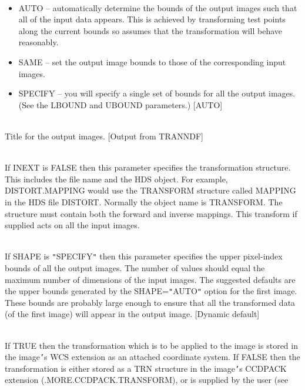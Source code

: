 \documentclass[twoside,11pt]{article}
\renewcommand{\_}{\texttt{\symbol{95}}}
\newcommand{\qt}[1]{{\tt "}#1{\tt "}}
\newcommand{\sstsubsection}[1]{ \item[{#1}] \mbox{} \\}
\newcommand{\sstitemlist}[1]{
  \mbox{} \\
  \vspace{-3.5ex}
  \begin{itemize}
     #1
  \end{itemize}
}
\newcommand{\sstitem}{\item}
\newcommand{\sstsubsection}[1]{\item[{#1}]}
\newcommand{\sstitemlist}[1]{
      \begin{itemize}
         #1
      \end{itemize}
      \\
   }
\newcommand{\sstitem}{\item}
\begin{document}
{{{         \sstitemlist{

            \sstitem
               AUTO    -- automatically determine the bounds of the
                            output images such that all of the input data
                            appears. This is achieved by transforming test
                            points along the current bounds so assumes
                            that the transformation will behave reasonably.

            \sstitem
               SAME    -- set the output image bounds to those of the
                            corresponding input images.

            \sstitem
               SPECIFY -- you will specify a single set of bounds for
                            all the output images. (See the LBOUND and UBOUND
                            parameters.)
            [AUTO]
         }
      }
      \sstsubsection{
         TITLE = LITERAL (Read)
      }{
         Title for the output images.
         [Output from TRANNDF]
      }
      \sstsubsection{
         TRANSFORM = TRN (Read)
      }{
         If INEXT is FALSE then this parameter specifies the
         transformation structure.  This includes the file name and the
         HDS object.  For example, DISTORT.MAPPING would use the
         TRANSFORM structure called MAPPING in the HDS file DISTORT.
         Normally the object name is TRANSFORM.  The structure must
         contain both the forward and inverse mappings. This transform
         if supplied acts on all the input images.
      }
      \sstsubsection{
         UBOUND() = \_INTEGER (Read)
      }{
         If SHAPE is \qt{SPECIFY} then this parameter specifies the upper
         pixel-index bounds of all the output images. The number of
         values should equal the maximum number of dimensions of the
         input images. The suggested defaults are the upper bounds
         generated by the SHAPE=\qt{AUTO} option for the first image. These
         bounds are probably large enough to ensure that all the
         transformed data (of the first image) will appear in the output
         image.
         [Dynamic default]
      }
      \sstsubsection{
         USEWCS = \_LOGICAL (Read)
      }{
         If TRUE then the transformation which is to be applied to the
         image is stored in the image{\tt '}s WCS extension as an attached
         coordinate system. If FALSE then the transformation is either
         stored as a TRN structure in the image{\tt '}s CCDPACK extension
         (.MORE.CCDPACK.TRANSFORM), or is supplied by the user (see
}}}
\end{document}
